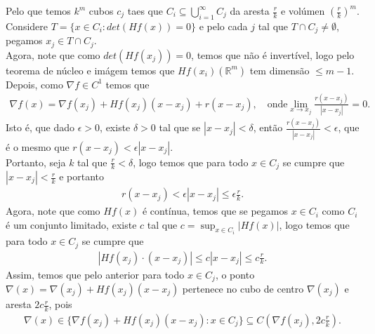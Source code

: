 \begin{homeworkProblem}[Seção 2-7]
\begin{solution}
\begin{center}
    \end{center}
    Pelo que temos $k^{m}$ cubos $c_j$ taes que $C_i\subseteq \bigcup_{i=1}^{\infty}C_j$ da aresta $\frac{r}{k}$ e volúmen $\left( \frac{r}{k} \right)^{m}$.\\
    Considere $T=\{x\in C_i:det(Hf(x))=0\}$ e pelo cada $j$ tal que $T\cap C_j\neq\emptyset$, pegamos $x_j\in T\cap C_j$.\\
    Agora, note que como $det(Hf(x_j))=0$, temos que não é invertível, logo pelo teorema de núcleo e imágem temos que $Hf(x_i)(\mathbb{R}^{m})$ tem dimensão $\leq m-1$.\\
    Depois, como $\nabla f\in C^{1}$ temos que
    \begin{align*}
      \nabla f(x)=\nabla f(x_j)+Hf(x_j)(x-x_j)+r(x-x_j),\quad\text{onde}\lim_{x \to x_j}\frac{r(x-x_j)}{|x-x_j|}=0.
    \end{align*}
    Isto é, que dado $\epsilon>0$, existe $\delta>0$ tal que se $|x-x_j|<\delta$, então $\frac{r(x-x_j)}{|x-x_j|}<\epsilon$, que é o mesmo que $r(x-x_j)<\epsilon|x-x_j|$.\\
    Portanto, seja $k$ tal que $\frac{r}{k}<\delta$, logo temos que para todo $x\in C_j$ se cumpre que $|x-x_j|<\frac{r}{k}$ e portanto 
    \begin{align*}
      r(x-x_j)<\epsilon|x-x_j|\leq \epsilon \frac{r}{k}. 
    \end{align*}
    Agora, note que como $Hf(x)$ é contínua, temos que se pegamos $x\in C_{i}$ como $C_i$ é um conjunto limitado, existe $c$ tal que $c=\sup_{x\in C_i}|Hf(x)|$, logo temos que para todo $x\in C_j$ se cumpre que
    \begin{align*}
      |Hf(x_j)\cdot (x-x_j)|\leq c|x-x_j|\leq c\frac{r}{k}.
    \end{align*}
    Assim, temos que pelo anterior para todo $x\in C_j$, o ponto $\nabla(x)=\nabla(x_j)+Hf(x_j)(x-x_j)$ pertenece no cubo de centro $\nabla(x_j)$ e aresta $2c\frac{r}{k}$, pois
    \begin{align*}
      \nabla(x)\in \{\nabla f(x_j)+Hf(x_j)(x-x_j):x\in C_j\}\subseteq C\left(\nabla f(x_j),2c\frac{r}{k}\right).
    \end{align*}

\end{solution}
\end{homeworkProblem}
